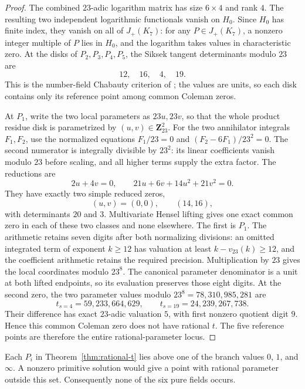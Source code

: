 \documentclass[11pt]{article}
\newcommand{\Z}{\mathbf Z}
\theoremstyle{definition}
\theoremstyle{remark}
\begin{document}
\begin{proof}
The combined $23$-adic logarithm matrix has size $6\times4$ and rank $4$.
The resulting two independent logarithmic functionals vanish on $H_0$.
Since $H_0$ has finite index, they vanish on all of $J_+(K_7)$: for any
$P\in J_+(K_7)$, a nonzero integer multiple of $P$ lies in $H_0$, and
the logarithm takes values in characteristic zero.  At the disks of $P_2,P_3,P_4,P_5$, the Siksek tangent
determinants modulo $23$ are
\begin{equation}\label{eq:siksek-dets}
                              12,\quad16,\quad4,\quad19.
\end{equation}
This is the number-field Chabauty criterion of \cite{Siksek}; the values are
units, so each disk contains only its reference point among common
Coleman zeros.

At $P_1$, write the two local parameters as $23u,23v$, so that the
whole product residue disk is parametrized by $(u,v)\in\Z_{23}^2$.
For the two annihilator integrals $F_1,F_2$, use the normalized equations
$F_1/23=0$ and $(F_2-6F_1)/23^2=0$.  The second numerator is integrally
divisible by $23^2$: its linear coefficients vanish modulo $23$ before
scaling, and all higher terms supply the extra factor.  The reductions are
\[
              2u+4v=0,\qquad
              21u+6v+14u^2+21v^2=0.
\]
They have exactly two simple reduced zeros,
\[
                         (u,v)=(0,0),\qquad(14,16),
\]
with determinants $20$ and $3$.  Multivariate Hensel lifting gives one
exact common zero in each of these two classes and none elsewhere.
The first is $P_1$.  The arithmetic retains seven digits after both
normalizing divisions: an omitted integrated term of exponent $k\ge12$
has valuation at least $k-v_{23}(k)\ge12$, and the coefficient arithmetic
retains the required precision.  Multiplication by $23$ gives the local
coordinates modulo $23^8$.  The canonical parameter denominator is a
unit at both lifted endpoints, so its evaluation preserves those eight
digits.  At the second zero, the two parameter values modulo
$23^8=78{,}310{,}985{,}281$ are
\[
 t_{s=4}=59{,}233{,}664{,}629,\qquad
 t_{s=19}=24{,}239{,}267{,}738.
\]
Their difference has exact $23$-adic valuation $5$, with first nonzero
quotient digit $9$.  Hence this common Coleman zero does not have rational
$t$.  The five reference points are therefore the entire rational-parameter
locus.
\end{proof}

Each $P_i$ in Theorem~\ref{thm:rational-t} lies above one of the branch
values $0$, $1$, and $\infty$.  A nonzero primitive solution would give a
point with rational parameter outside this set.  Consequently none of the six pure fields occurs.
\end{document}
